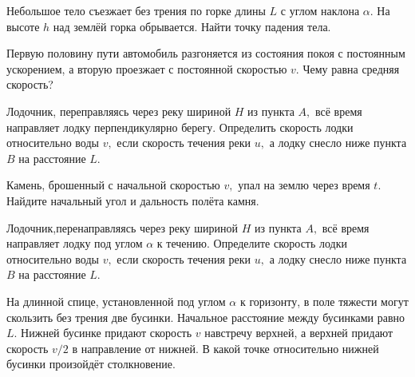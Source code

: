 \begin{task}
Небольшое тело съезжает без трения по горке длины $L$ с углом наклона $\alpha.$ На высоте
$h$ над землёй горка обрывается. Найти точку падения тела.
\label{task:k-08-2-9}
\end{task}
\begin{task}
Первую половину пути автомобиль разгоняется из состояния покоя с постоянным ускорением, а вторую проезжает
с постоянной скоростью $v.$ Чему равна средняя скорость?
\label{task:k-08-1-10}
\end{task}
\begin{task}
Лодочник, переправляясь через реку шириной $H$ из пункта $A,$ всё время направляет
лодку перпендикулярно берегу. Определить скорость лодки относительно воды $v,$ если скорость
течения реки $u,$ а лодку снесло ниже пункта $B$ на расстояние $L.$
\label{task:k-09-1-9}
\end{task}
\begin{task}
Камень, брошенный с начальной скоростью $v,$ упал на землю через время $t.$ Найдите начальный угол
и дальность полёта камня.
\label{task:k-09-2-9}
\end{task}
\begin{task}
Лодочник,перенаправляясь через реку шириной $H$ из пункта $A,$ всё время направляет лодку
под углом $\alpha$ к течению. Определите скорость лодки относительно воды $v,$ если скорость
течения реки $u,$ а лодку снесло ниже пункта $B$ на расстояние $L.$
\label{task:k-09-1-10}
\end{task}
\begin{task}
На длинной спице, установленной под углом $\alpha$ к горизонту, в поле тяжести могут скользить
без трения две бусинки. Начальное расстояние между бусинками равно $L.$ Нижней бусинке придают
скорость $v$ навстречу верхней, а верхней придают скорость $v/2$ в направление от нижней. В какой точке
относительно нижней бусинки произойдёт столкновение.
\label{task:k-11-1}
\end{task}
